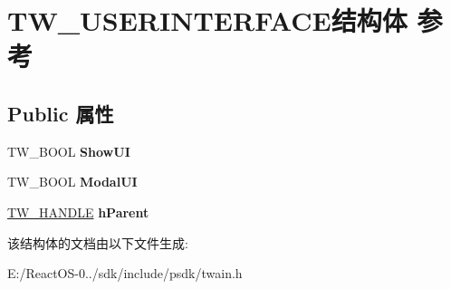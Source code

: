\hypertarget{struct_t_w___u_s_e_r_i_n_t_e_r_f_a_c_e}{}\section{T\+W\+\_\+\+U\+S\+E\+R\+I\+N\+T\+E\+R\+F\+A\+C\+E结构体 参考}
\label{struct_t_w___u_s_e_r_i_n_t_e_r_f_a_c_e}
\subsection*{Public 属性}
\begin{DoxyCompactItemize}
\item 
\mbox{\label{struct_t_w___u_s_e_r_i_n_t_e_r_f_a_c_e_aa24ca9fee906f61f43169aba521ddef1}} 
T\+W\+\_\+\+B\+O\+OL {\bfseries Show\+UI}
\item 
\mbox{\label{struct_t_w___u_s_e_r_i_n_t_e_r_f_a_c_e_a286a8f646e2462a6422510205e027bab}} 
T\+W\+\_\+\+B\+O\+OL {\bfseries Modal\+UI}
\item 
\mbox{\label{struct_t_w___u_s_e_r_i_n_t_e_r_f_a_c_e_a5b151fcbe2aa626f8568aa717f18c0b4}} 
\hyperlink{interfacevoid}{T\+W\+\_\+\+H\+A\+N\+D\+LE} {\bfseries h\+Parent}
\end{DoxyCompactItemize}


该结构体的文档由以下文件生成\+:\begin{DoxyCompactItemize}
\item 
E\+:/\+React\+O\+S-\/0../sdk/include/psdk/twain.\+h\end{DoxyCompactItemize}

